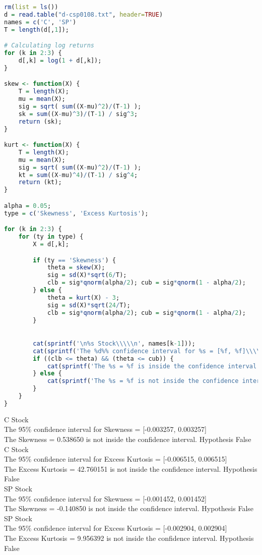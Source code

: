 \documentclass{article}
\begin{document}
\begin{lstlisting}[language=R]
rm(list = ls())
d = read.table("d-csp0108.txt", header=TRUE)
names = c('C', 'SP')
T = length(d[,1]);

# Calculating log returns
for (k in 2:3) {
	d[,k] = log(1 + d[,k]);
}

skew <- function(X) {
	T = length(X);
	mu = mean(X);
	sig = sqrt( sum((X-mu)^2)/(T-1) );
	sk = sum((X-mu)^3)/(T-1) / sig^3;
	return (sk);
}

kurt <- function(X) {
	T = length(X);
	mu = mean(X);
	sig = sqrt( sum((X-mu)^2)/(T-1) );
	kt = sum((X-mu)^4)/(T-1) / sig^4;
	return (kt);
}

alpha = 0.05;
type = c('Skewness', 'Excess Kurtosis');

for (k in 2:3) {
	for (ty in type) {
		X = d[,k];

		if (ty == 'Skewness') {
			theta = skew(X);
			sig = sd(X)*sqrt(6/T);
			clb = sig*qnorm(alpha/2); cub = sig*qnorm(1 - alpha/2);
		} else {
			theta = kurt(X) - 3;
			sig = sd(X)*sqrt(24/T);
			clb = sig*qnorm(alpha/2); cub = sig*qnorm(1 - alpha/2);
		}
		

		cat(sprintf('\n%s Stock\\\\\n', names[k-1]));
		cat(sprintf('The %d%% confidence interval for %s = [%f, %f]\\\\\n', 100*(1-alpha), ty, clb, cub));
		if ((clb <= theta) && (theta <= cub)) {
			cat(sprintf('The %s = %f is inside the confidence interval.\\\\\n\n', ty, theta));
		} else {
			cat(sprintf('The %s = %f is not inside the confidence interval.\\\\\n\n', ty, theta));
		}
	}
}

\end{lstlisting}

C Stock\\
The 95\% confidence interval for Skewness = [-0.003257, 0.003257]\\
The Skewness = 0.538650 is not inside the confidence interval. Hypothesis False\\


C Stock\\
The 95\% confidence interval for Excess Kurtosis = [-0.006515, 0.006515]\\
The Excess Kurtosis = 42.760151 is not inside the confidence interval. Hypothesis False\\


SP Stock\\
The 95\% confidence interval for Skewness = [-0.001452, 0.001452]\\
The Skewness = -0.140850 is not inside the confidence interval. Hypothesis False\\


SP Stock\\
The 95\% confidence interval for Excess Kurtosis = [-0.002904, 0.002904]\\
The Excess Kurtosis = 9.956392 is not inside the confidence interval. Hypothesis False\\
\end{document}
